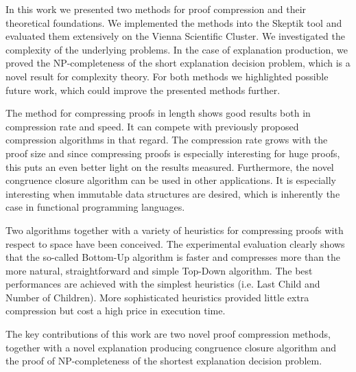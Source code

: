 
In this work we presented two methods for proof compression and their theoretical foundations.
We implemented the methods into the Skeptik tool and evaluated them extensively on the Vienna Scientific Cluster.
We investigated the complexity of the underlying problems.
In the case of explanation production, we proved the NP-completeness of the short explanation decision problem, which is a novel result for complexity theory.
For both methods we highlighted possible future work, which could improve the presented methods further.

The method for compressing proofs in length shows good results both in compression rate and speed.
It can compete with previously proposed compression algorithms in that regard.
The compression rate grows with the proof size and since compressing proofs is especially interesting for huge proofs, this puts an even better light on the results measured.
Furthermore, the novel congruence closure algorithm can be used in other applications.
It is especially interesting when immutable data structures are desired, which is inherently the case in functional programming languages.

Two algorithms together with a variety of heuristics for compressing proofs with respect to space have been conceived. 
The experimental evaluation clearly shows that the so-called Bottom-Up algorithm is faster and compresses more than the more natural, straightforward and simple Top-Down algorithm. 
The best performances are achieved with the simplest heuristics (i.e. Last Child and Number of Children). 
More sophisticated heuristics provided little extra compression but cost a high price in execution time. 

The key contributions of this work are two novel proof compression methods, together with a novel explanation producing congruence closure algorithm and the proof of NP-completeness of the shortest explanation decision problem.